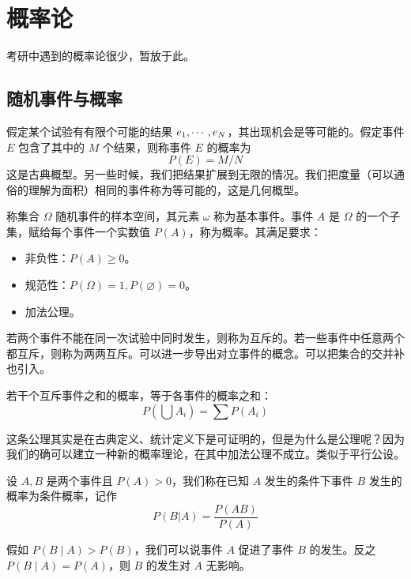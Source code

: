 \chapter{概率论}

考研中遇到的概率论很少，暂放于此。

\section{随机事件与概率}

假定某个试验有有限个可能的结果 $e_1,\cdots,e_N$，其出现机会是等可能的。假定事件 $E$ 包含了其中的 $M$ 个结果，则称事件 $E$ 的概率为
\[ P(E) = M / N \]
这是古典概型。另一些时候，我们把结果扩展到无限的情况。我们把度量（可以通俗的理解为面积）相同的事件称为等可能的，这是几何概型。

称集合 $\Omega$ 随机事件的样本空间，其元素 $\omega$ 称为基本事件。事件 $A$ 是 $\Omega$ 的一个子集，赋给每个事件一个实数值 $P(A)$，称为概率。其满足要求：

\begin{itemize}
	\item 非负性：$P(A) \geqslant 0$。
	\item 规范性：$P(\Omega) = 1, P(\varnothing) = 0$。
	\item 加法公理。
\end{itemize}

若两个事件不能在同一次试验中同时发生，则称为互斥的。若一些事件中任意两个都互斥，则称为两两互斥。可以进一步导出对立事件的概念。可以把集合的交并补也引入。

\begin{theorem}[加法公理]
	若干个互斥事件之和的概率，等于各事件的概率之和：
	\[ P\left(\bigcup A_i\right) = \sum P(A_i) \]
\end{theorem}

\begin{note}
	这条公理其实是在古典定义、统计定义下是可证明的，但是为什么是公理呢？因为我们的确可以建立一种新的概率理论，在其中加法公理不成立。类似于平行公设。
\end{note}

\begin{definition}
	设 $A,B$ 是两个事件且 $P(A) > 0$，我们称在已知 $A$ 发生的条件下事件 $B$ 发生的概率为条件概率，记作
	\[ P(B | A) = \frac{P(AB)}{P(A)} \]
\end{definition}

假如 $P(B \mid A) > P(B)$，我们可以说事件 $A$ 促进了事件 $B$ 的发生。反之 $P(B \mid A) = P(A)$，则 $B$ 的发生对 $A$ 无影响。

